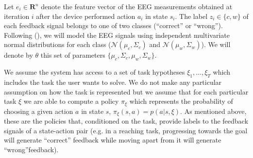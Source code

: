 Let $e_i\in \mathbf{R}^n$ denote the feature vector of the EEG measurements obtained at iteration $i$ after the device performed action $a_i$ in state $s_i$. The label $z_i\in\{c,w\}$ of each feedback signal belongs to one of two classes (``correct'' or ``wrong'').
%
Following \cite{blankertz2010single} (\cite{blankertz2010single}), we will model the EEG signals using independent multivariate normal distributions for each class ($\mathcal{N}(\mu_c, \Sigma_c)$ and $\mathcal{N}(\mu_w, \Sigma_w)$). We will denote by $\theta$ this set of parameters $\{\mu_c, \Sigma_c,\mu_w, \Sigma_w\}$.

We assume the system has access to a set of task hypotheses $\xi_1,\ldots,\xi_T$ which includes the task the user wants to solve. We do not make any particular assumption on how the task is represented but we assume that for each particular task $\xi$ we are able to compute a policy $\pi_\xi$ which represents the probability of choosing a given action $a$ in state $s$, $\pi_{\xi}(s,a) = p(a|s,\xi)$. As mentioned above, these are the policies that, conditioned on the task, provide labels to the feedback signals of a state-action pair (e.g. in a reaching task, progressing towards the goal will generate ``correct'' feedback while moving apart from it will generate ``wrong''feedback).

